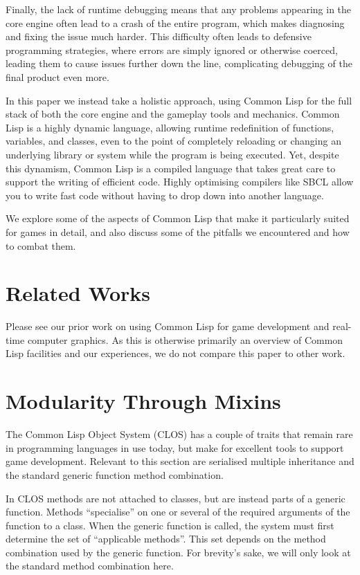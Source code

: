 \documentclass[a4paper]{paper}
\begin{document}
Finally, the lack of runtime debugging means that any problems appearing in the core engine often lead to a crash of the entire program, which makes diagnosing and fixing the issue much harder. This difficulty often leads to defensive programming strategies, where errors are simply ignored or otherwise coerced, leading them to cause issues further down the line, complicating debugging of the final product even more.

In this paper we instead take a holistic approach, using Common Lisp for the full stack of both the core engine and the gameplay tools and mechanics. Common Lisp is a highly dynamic language, allowing runtime redefinition of functions, variables, and classes, even to the point of completely reloading or changing an underlying library or system while the program is being executed. Yet, despite this dynamism, Common Lisp is a compiled language that takes great care to support the writing of efficient code. Highly optimising compilers like SBCL allow you to write fast code without having to drop down into another language.

We explore some of the aspects of Common Lisp that make it particularly suited for games in detail, and also discuss some of the pitfalls we encountered and how to combat them.

\section{Related Works}
Please see our prior work on using Common Lisp for game development and real-time computer graphics\cite{hafner2018shader}\cite{hafner2019shader}. As this is otherwise primarily an overview of Common Lisp facilities and our experiences, we do not compare this paper to other work.

\section{Modularity Through Mixins}
The Common Lisp Object System (CLOS) has a couple of traits that remain rare in programming languages in use today, but make for excellent tools to support game development. Relevant to this section are serialised multiple inheritance and the standard generic function method combination.

In CLOS methods are not attached to classes, but are instead parts of a generic function. Methods ``specialise'' on one or several of the required arguments of the function to a class. When the generic function is called, the system must first determine the set of ``applicable methods''. This set depends on the method combination used by the generic function. For brevity's sake, we will only look at the standard method combination here.
\end{document}
